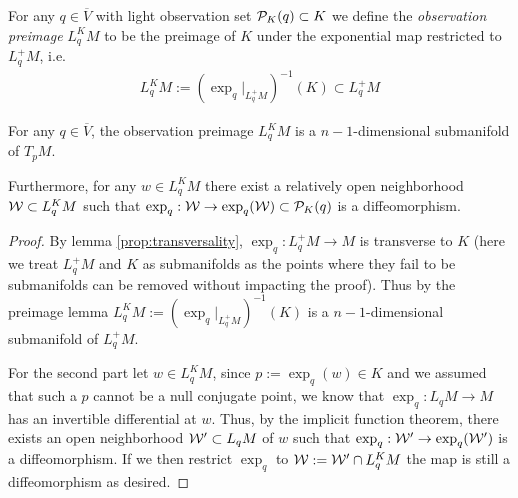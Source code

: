 \begin{definition}
For any $q\in \overline{V}$ with light observation set $\mathcal{P}_K(q)\subset K$ we define the \emph{observation preimage} $L^K_qM$ to be the preimage of $K$ under the exponential map restricted to $L^+_qM$, i.e. 
\begin{align*}
    L^K_qM := (\exp_q\rvert_{L^+_qM})^{-1}(K) \subset L^+_qM
\end{align*}
\end{definition}
\begin{lemma}\label{lem:preimage}
For any $q\in \overline{V}$, the observation preimage $L^K_qM$ is a $n-1$-dimensional submanifold of $T_pM$. 

Furthermore, for any $w\in L^K_qM$ there exist a relatively open neighborhood $\mathcal{W}\subset L^K_qM$ such that $\exp_q:\mathcal{W}\to \exp_q(\mathcal{W})\subset \mathcal{P}_K(q)$ is a diffeomorphism.
\end{lemma}
\begin{proof}
    By lemma \ref{prop:transversality}, $\exp_q:L^+_qM\to M$ is transverse to $K$ (here we treat $L^+_qM$ and $K$ as submanifolds as the points where they fail to be submanifolds can be removed without impacting the proof). Thus by the preimage lemma $ L^K_qM := (\exp_q\rvert_{L^+_qM})^{-1}(K)$ is a $n-1$-dimensional submanifold of $L^+_qM$.

    For the second part let $w\in L^K_qM$, since $p:=\exp_q(w)\in K$ and we assumed that such a $p$ cannot be a null conjugate point, we know that $\exp_q:L_qM\to M$ has an invertible differential at $w$. Thus, by the implicit function theorem, there exists an open neighborhood $\mathcal{W}'\subset L_qM$ of $w$ such that $\exp_q:\mathcal{W}'\to \exp_q(\mathcal{W}')$ is a diffeomorphism. If we then restrict $\exp_q$ to $\mathcal{W}:=\mathcal{W}' \cap L^K_qM$ the map is still a diffeomorphism as desired.
\end{proof}

